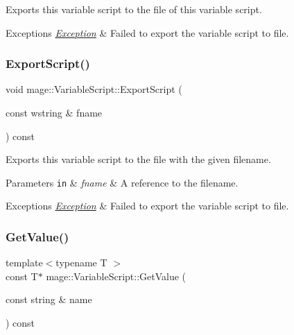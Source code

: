 Exports this variable script to the file of this variable script.


\begin{DoxyExceptions}{Exceptions}
{\em \mbox{\hyperlink{classmage_1_1_exception}{Exception}}} & Failed to export the variable script to file. \\
\hline
\end{DoxyExceptions}
\mbox{\label{classmage_1_1_variable_script_a05ce2bcc72418422a443bcd8eff23486}} 
\subsubsection{\texorpdfstring{Export\+Script()}{ExportScript()}\hspace{0.1cm}{\footnotesize\ttfamily [2/2]}}
{\footnotesize\ttfamily void mage\+::\+Variable\+Script\+::\+Export\+Script (\begin{DoxyParamCaption}\item[{const wstring \&}]{fname }\end{DoxyParamCaption}) const}

Exports this variable script to the file with the given filename.


\begin{DoxyParams}[1]{Parameters}
\mbox{\tt in}  & {\em fname} & A reference to the filename. \\
\hline
\end{DoxyParams}

\begin{DoxyExceptions}{Exceptions}
{\em \mbox{\hyperlink{classmage_1_1_exception}{Exception}}} & Failed to export the variable script to file. \\
\hline
\end{DoxyExceptions}
\mbox{\label{classmage_1_1_variable_script_aaed50c03f7affeeac269fbc15248caf6}} 
\subsubsection{\texorpdfstring{Get\+Value()}{GetValue()}}
{\footnotesize\ttfamily template$<$typename T $>$ \\
const T$\ast$ mage\+::\+Variable\+Script\+::\+Get\+Value (\begin{DoxyParamCaption}\item[{const string \&}]{name }\end{DoxyParamCaption}) const}

